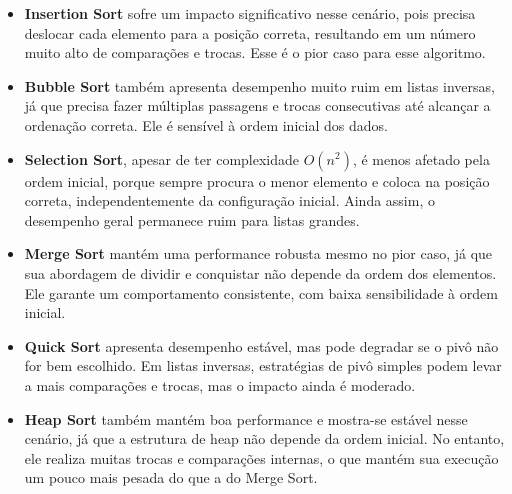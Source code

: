 \documentclass[12pt, a4paper]{report}
\begin{document}
\begin{itemize}
    \item \textbf{Insertion Sort} sofre um impacto significativo nesse cenário, pois precisa deslocar cada elemento para a posição correta, resultando em um número muito alto de comparações e trocas. Esse é o pior caso para esse algoritmo.

    \item \textbf{Bubble Sort} também apresenta desempenho muito ruim em listas inversas, já que precisa fazer múltiplas passagens e trocas consecutivas até alcançar a ordenação correta. Ele é sensível à ordem inicial dos dados.

    \item \textbf{Selection Sort}, apesar de ter complexidade $O(n^2)$, é menos afetado pela ordem inicial, porque sempre procura o menor elemento e coloca na posição correta, independentemente da configuração inicial. Ainda assim, o desempenho geral permanece ruim para listas grandes.

    \item \textbf{Merge Sort} mantém uma performance robusta mesmo no pior caso, já que sua abordagem de dividir e conquistar não depende da ordem dos elementos. Ele garante um comportamento consistente, com baixa sensibilidade à ordem inicial.

    \item \textbf{Quick Sort} apresenta desempenho estável, mas pode degradar se o pivô não for bem escolhido. Em listas inversas, estratégias de pivô simples podem levar a mais comparações e trocas, mas o impacto ainda é moderado.

    \item \textbf{Heap Sort} também mantém boa performance e mostra-se estável nesse cenário, já que a estrutura de heap não depende da ordem inicial. No entanto, ele realiza muitas trocas e comparações internas, o que mantém sua execução um pouco mais pesada do que a do Merge Sort.

\end{itemize}
\end{document}
